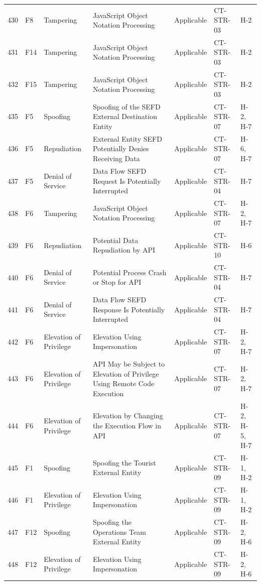\begin{footnotesize}
\begin{longtable}{l l p{} p{} p{} l p{}}
        430 & F8 & Tampering & JavaScript Object Notation Processing & Applicable & CT-STR-03 & H-2 \\
        431 & F14 & Tampering & JavaScript Object Notation Processing & Applicable & CT-STR-03 & H-2 \\
        432 & F15 & Tampering & JavaScript Object Notation Processing & Applicable & CT-STR-03 & H-2 \\
        435 & F5 & Spoofing & Spoofing of the SEFD External Destination Entity & Applicable & CT-STR-07 & H-2, H-7 \\
        436 & F5 & Repudiation & External Entity SEFD Potentially Denies Receiving Data & Applicable & CT-STR-07 & H-6, H-7 \\
        437 & F5 & Denial of Service & Data Flow SEFD Request Is Potentially Interrupted & Applicable & CT-STR-04 & H-7 \\
        438 & F6 & Tampering & JavaScript Object Notation Processing & Applicable & CT-STR-07 & H-2, H-7 \\
        439 & F6 & Repudiation & Potential Data Repudiation by API & Applicable & CT-STR-10 & H-6 \\
        440 & F6 & Denial of Service & Potential Process Crash or Stop for API & Applicable & CT-STR-04 & H-7 \\
        441 & F6 & Denial of Service & Data Flow SEFD Response Is Potentially Interrupted & Applicable & CT-STR-04 & H-7 \\
        442 & F6 & Elevation of Privilege & Elevation Using Impersonation & Applicable & CT-STR-07 & H-2, H-7 \\
        443 & F6 & Elevation of Privilege & API May be Subject to Elevation of Privilege Using Remote Code Execution & Applicable & CT-STR-07 & H-2, H-7 \\
        444 & F6 & Elevation of Privilege & Elevation by Changing the Execution Flow in API & Applicable & CT-STR-07 & H-2, H-5, H-7 \\
        445 & F1 & Spoofing & Spoofing the Tourist External Entity & Applicable & CT-STR-09 & H-1, H-2 \\
        446 & F1 & Elevation of Privilege & Elevation Using Impersonation & Applicable & CT-STR-09 & H-1, H-2 \\
        447 & F12 & Spoofing & Spoofing the Operations Team External Entity & Applicable & CT-STR-09 & H-2, H-6 \\
        448 & F12 & Elevation of Privilege & Elevation Using Impersonation & Applicable & CT-STR-09 & H-2, H-6 \\
\end{longtable}
\end{footnotesize}
